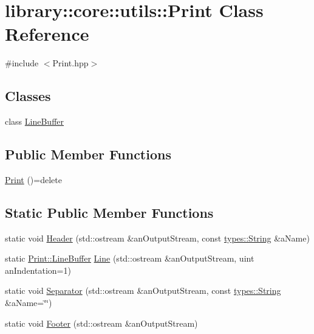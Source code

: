\hypertarget{classlibrary_1_1core_1_1utils_1_1_print}{}\section{library\+:\+:core\+:\+:utils\+:\+:Print Class Reference}
\label{classlibrary_1_1core_1_1utils_1_1_print}


{\ttfamily \#include $<$Print.\+hpp$>$}

\subsection*{Classes}
\begin{DoxyCompactItemize}
\item 
class \hyperlink{classlibrary_1_1core_1_1utils_1_1_print_1_1_line_buffer}{Line\+Buffer}
\end{DoxyCompactItemize}
\subsection*{Public Member Functions}
\begin{DoxyCompactItemize}
\item 
\hyperlink{classlibrary_1_1core_1_1utils_1_1_print_a2d7ca0fac9e9dc7fa8b8b40f7b784198}{Print} ()=delete
\end{DoxyCompactItemize}
\subsection*{Static Public Member Functions}
\begin{DoxyCompactItemize}
\item 
static void \hyperlink{classlibrary_1_1core_1_1utils_1_1_print_a828afa2d09d997e2ad5b5a93ab81bcb0}{Header} (std\+::ostream \&an\+Output\+Stream, const \hyperlink{classlibrary_1_1core_1_1types_1_1_string}{types\+::\+String} \&a\+Name)
\item 
static \hyperlink{classlibrary_1_1core_1_1utils_1_1_print_1_1_line_buffer}{Print\+::\+Line\+Buffer} \hyperlink{classlibrary_1_1core_1_1utils_1_1_print_ab4d98c65fbb58213358df534dd1f6d65}{Line} (std\+::ostream \&an\+Output\+Stream, uint an\+Indentation=1)
\item 
static void \hyperlink{classlibrary_1_1core_1_1utils_1_1_print_a2c2f28c75ecbee13ea972f49ea4a3adb}{Separator} (std\+::ostream \&an\+Output\+Stream, const \hyperlink{classlibrary_1_1core_1_1types_1_1_string}{types\+::\+String} \&a\+Name=\char`\"{}\char`\"{})
\item 
static void \hyperlink{classlibrary_1_1core_1_1utils_1_1_print_a5c9f1797eafda1b8e8ef95d5a2902df2}{Footer} (std\+::ostream \&an\+Output\+Stream)
\end{DoxyCompactItemize}


